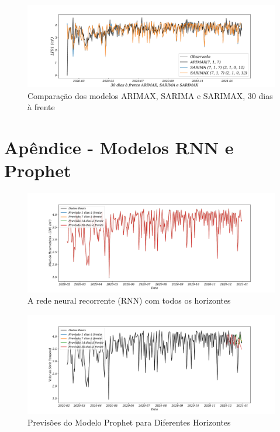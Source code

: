 \begin{figure}[!htpb]
	\centering
	\caption{Comparação dos modelos ARIMAX, SARIMA e SARIMAX, 30 dias à frente }
	\label{fig:60-ARIMAX-SARIMA-SARIMAX24}
	\includegraphics[width=1\linewidth]{Apendices/Figuras/modelagem-24h/30-ARIMAX-SARIMA-SARIMAX}
	
\end{figure}

\newpage

\section{Ap\^endice - Modelos RNN e Prophet }\label{sec:rnnprophet}

\begin{figure}[!htpb]
	\centering
	\caption{A rede neural recorrente (RNN) com todos os horizontes }
	\label{fig:rnn}
	\includegraphics[width=1\linewidth]{Apendices/Figuras/modelagem-24h/RNN}
	
\end{figure}

\begin{figure}[!htpb]
	\centering
	\caption{Previsões do Modelo Prophet para Diferentes Horizontes}
	\label{fig:prophet}
	\includegraphics[width=1\linewidth]{Apendices/Figuras/modelagem-24h/prophet}
	
\end{figure}
